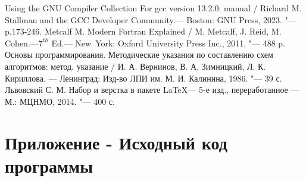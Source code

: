 \documentclass[a4paper, 12pt] {article}
\begin{document}

\newpage
\begin{thebibliography}{9}
   Using the GNU Compiler Collection For gcc version 13.2.0:
    manual / Richard M. Stallman and the GCC Developer Community.---
    Boston: GNU Press, 2023. "--- p.173-246.
   Metcalf M. Modern Fortran Explained /
    M. Metcalf, J. Reid, M. Cohen.---$7^{th}$ Ed.--- New~York: Oxford
    University Press Inc., 2011. "--- 488 p.
   Основы программирования. Методические указания
    по составлению схем алгоритмов: метод. указание / И. А. Вернинов,
    В. А. Зимницкий, Л. К. Кириллова. --- Ленинград: Изд-во ЛПИ
    им. М. И. Калинина, 1986. "--- 39 с.
   Львовский С. М. Набор и верстка в пакете \LaTeX --- 5-е изд., переработанное --- М.: МЦНМО, 2014. "--- 400 с.

\end{thebibliography}

\newpage
\appendix\label{appendix_01}
\section{Приложение - Исходный код программы}


\end{document}
